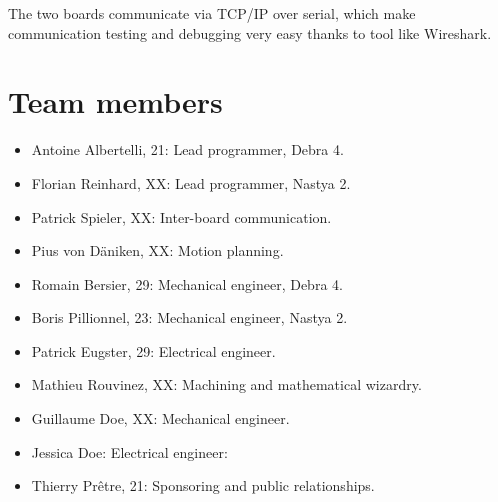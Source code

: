 \documentclass[a4paper]{paper}
\begin{document}
The two boards communicate via TCP/IP over serial, which make communication testing and debugging very easy thanks to tool like Wireshark.


\section{Team members}
\begin{itemize}
    \item Antoine Albertelli, 21:  Lead programmer, Debra 4.
    \item Florian Reinhard, XX:  Lead programmer, Nastya 2.
    \item Patrick Spieler, XX:  Inter-board communication.
    \item Pius von Däniken, XX:  Motion planning.
    \item Romain Bersier, 29:  Mechanical engineer, Debra 4.
    \item Boris Pillionnel, 23:  Mechanical engineer, Nastya 2.
    \item Patrick Eugster, 29:  Electrical engineer.
    \item Mathieu Rouvinez, XX:  Machining and mathematical wizardry.
    \item Guillaume Doe, XX: Mechanical engineer.
    \item Jessica Doe: Electrical engineer:
    \item Thierry Prêtre, 21:  Sponsoring and public relationships.
\end{itemize}
\end{document}
